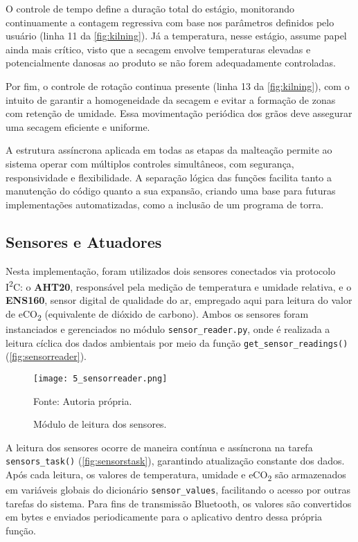 O controle de tempo define a duração total do estágio, monitorando continuamente a contagem regressiva com base nos parâmetros definidos pelo usuário (linha 11 da \autoref{fig:kilning}). Já a temperatura, nesse estágio, assume papel ainda mais crítico, visto que a secagem envolve temperaturas elevadas e potencialmente danosas ao produto se não forem adequadamente controladas.

Por fim, o controle de rotação continua presente (linha 13 da \autoref{fig:kilning}), com o intuito de garantir a homogeneidade da secagem e evitar a formação de zonas com retenção de umidade. Essa movimentação periódica dos grãos deve assegurar uma secagem eficiente e uniforme.

A estrutura assíncrona aplicada em todas as etapas da malteação permite ao sistema operar com múltiplos controles simultâneos, com segurança, responsividade e flexibilidade. A separação lógica das funções facilita tanto a manutenção do código quanto a sua expansão, criando uma base para futuras implementações automatizadas, como a inclusão de um programa de torra.

\subsection{Sensores e Atuadores}

Nesta implementação, foram utilizados dois sensores conectados via protocolo I\textsuperscript{2}C: o \textbf{AHT20}, responsável pela medição de temperatura e umidade relativa, e o \textbf{ENS160}, sensor digital de qualidade do ar, empregado aqui para leitura do valor de eCO\textsubscript{2} (equivalente de dióxido de carbono). Ambos os sensores foram instanciados e gerenciados no módulo \texttt{sensor\_reader.py}, onde é realizada a leitura cíclica dos dados ambientais por meio da função \texttt{get\_sensor\_readings()} (\autoref{fig:sensorreader}).

\begin{figure}[ht]
    \centering
    \caption{Módulo de leitura dos sensores.}
    \label{fig:sensorreader}
    \texttt{[image: 5\_sensorreader.png]}

    {\centering\footnotesize Fonte: Autoria própria.\par}
\end{figure}

A leitura dos sensores ocorre de maneira contínua e assíncrona na tarefa \texttt{sensors\_task()} (\autoref{fig:sensorstask}), garantindo atualização constante dos dados. Após cada leitura, os valores de temperatura, umidade e eCO\textsubscript{2} são armazenados em variáveis globais do dicionário \texttt{sensor\_values}, facilitando o acesso por outras tarefas do sistema. Para fins de transmissão Bluetooth, os valores são convertidos em bytes e enviados periodicamente para o aplicativo dentro dessa própria função.

